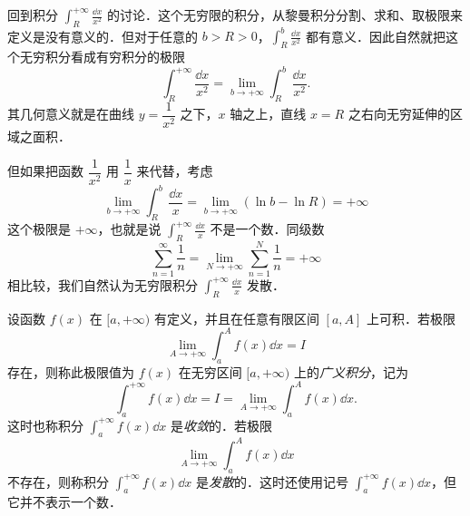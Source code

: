 回到积分 $\displaystyle\int_{R}^{+\infty}\frac{\dd x}{x^{2}}$ 的讨论．这个无穷限的积分，从黎曼积分分割、求和、取极限来定义是没有意义的．但对于任意的 $b>R>0$，$\displaystyle\int_{R}^{b}\frac{\dd x}{x^{2}}$ 都有意义．因此自然就把这个无穷积分看成有穷积分的极限
\[
\int_{R}^{+\infty}\frac{\dd x}{x^{2}}=\lim_{b\to+\infty}\int_{R}^{b}\frac{\dd x}{x^{2}}.
\]
其几何意义就是在曲线 $y=\dfrac{1}{x^{2}}$ 之下，$x$ 轴之上，直线 $x=R$ 之右向无穷延伸的区域之面积．

\begin{figure}[htbp]
\centering
{}\caption{\relax}\label{fig:11-1}
\end{figure}

但如果把函数 $\dfrac{1}{x^{2}}$ 用 $\dfrac{1}{x}$ 来代替，考虑
\[
\lim_{b\to+\infty}\int_{R}^{b}\frac{\dd x}{x}=\lim_{b\to+\infty}\left(\ln b-\ln R\right)=+\infty
\]
这个极限是 $+\infty$，也就是说 $\displaystyle\int_{R}^{+\infty}\frac{\dd x}{x}$ 不是一个数．同级数
\[
\sum_{n=1}^{\infty}\frac{1}{n}=\lim_{N\to+\infty}\sum_{n=1}^{N}\frac{1}{n}=+\infty
\]
相比较，我们自然认为无穷限积分 $\displaystyle\int_{R}^{+\infty}\frac{\dd x}{x}$ 发散．

\begin{definition}\label{def:11-1}
设函数 $f(x)$ 在 $[a,+\infty)$ 有定义，并且在任意有限区间 $[a,A]$ 上可积．若极限
\[
\lim_{A\to+\infty}\int_{a}^{A}f(x)\dd x=I
\]
存在，则称此极限值为 $f(x)$ 在无穷区间 $[a,+\infty)$ 上的\emph{广义积分}，记为
\[
\int_{a}^{+\infty}f(x)\dd x=I=\lim_{A\to+\infty}\int_{a}^{A}f(x)\dd x.
\]
这时也称积分 $\displaystyle\int_{a}^{+\infty}f(x)\dd x$ 是\emph{收敛}的．若极限
\[
\lim_{A\to+\infty}\int_{a}^{A}f(x)\dd x
\]
不存在，则称积分 $\displaystyle\int_{a}^{+\infty}f(x)\dd x$ 是\emph{发散}的．这时还使用记号 $\displaystyle\int_{a}^{+\infty}f(x)\dd x$，但它并不表示一个数．
\end{definition}

